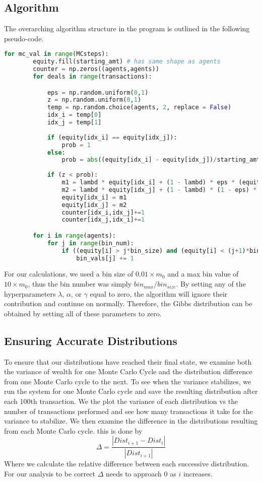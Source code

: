 \documentclass{emulateapj}
\begin{document}
\subsection{Algorithm}
The overarching algorithm structure in the program is outlined in the following pseudo-code.
\begin{lstlisting}[language=python]
    for mc_val in range(MCsteps):
        equity.fill(starting_amt) # has same shape as agents
        counter = np.zeros((agents,agents))
        for deals in range(transactions):

            eps = np.random.uniform(0,1)
            z = np.random.uniform(0,1)
            temp = np.random.choice(agents, 2, replace = False)
            idx_i = temp[0]
            idx_j = temp[1]
            
            if (equity[idx_i] == equity[idx_j]):
                prob = 1
            else:
                prob = abs((equity[idx_i] - equity[idx_j])/starting_amt)**(-alpha)*(counter[idx_i,idx_j] + 1)**gamma
            
            if (z < prob):
                m1 = lambd * equity[idx_i] + (1 - lambd) * eps * (equity[idx_i] + equity[idx_j])
                m2 = lambd * equity[idx_j] + (1 - lambd) * (1 - eps) * (equity[idx_i] + equity[idx_j])
                equity[idx_i] = m1
                equity[idx_j] = m2
                counter[idx_i,idx_j]+=1
                counter[idx_j,idx_i]+=1

        for i in range(agents):
            for j in range(bin_num):
                if ((equity[i] > j*bin_size) and (equity[i] < (j+1)*bin_size)):
                    bin_vals[j] += 1
\end{lstlisting}
For our calculations, we used a bin size of $0.01\times m_0$ and a max bin value of $10 \times m_0$, thus the bin number was simply $bin_{max} / bin_{size}$. By setting any of the hyperparameters $\lambda$, $\alpha$, or $\gamma$ equal to zero, the algorithm will ignore their contribution and continue on normally. Therefore, the Gibbs distribution can be obtained by setting all of these parameters to zero.
\subsection{Ensuring Accurate Distributions}
To ensure that our distributions have reached their final state, we examine both the variance of wealth for one Monte Carlo Cycle and the distribution difference from one Monte Carlo cycle to the next. To see when the variance stabilizes, we run the system for one Monte Carlo cycle and save the resulting distribution after each 100th transaction. We the plot the variance of each distribution vs the number of transactions performed and see how many transactions it take for the variance to stabilize. We then examine the difference in the distributions resulting from each Monte Carlo cycle. this is done by
\begin{equation}
    \Delta = \frac{|Dist_{i+1}-Dist_i|}{|Dist_{i+1}|}
\end{equation}
Where we calculate the relative difference between each successive distribution. For our analysis to be correct $\Delta$ needs to approach $0$ as $i$ increases.
\end{document}
